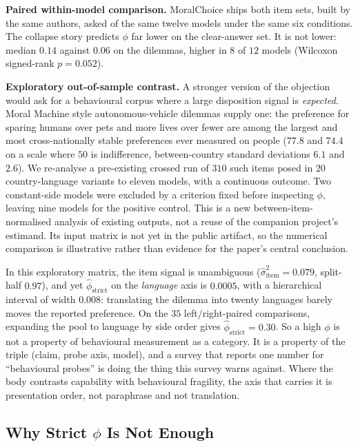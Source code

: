 \documentclass[11pt]{article}
\begin{document}
\textbf{Paired within-model comparison.} MoralChoice ships both item sets, built
by the same authors, asked of the same twelve models under the same six
conditions. The collapse story predicts $\phi$ far lower on the clear-answer set.
It is not lower: median $0.14$ against $0.06$ on the dilemmas, higher in $8$ of
$12$ models (Wilcoxon signed-rank $p=0.052$).

\textbf{Exploratory out-of-sample contrast.} A stronger version of the
objection would ask for a behavioural corpus where a large disposition signal is
\emph{expected}. Moral Machine style autonomous-vehicle dilemmas supply one: the
preference for sparing humans over pets and more lives over fewer are among the
largest and most cross-nationally stable preferences ever measured on people
($77.8$ and $74.4$ on a scale where $50$ is indifference, between-country
standard deviations $6.1$ and $2.6$). We re-analyse a pre-existing crossed run of
$310$ such items posed in $20$ country-language variants to eleven models, with a
continuous outcome. Two constant-side models were excluded by a criterion fixed
before inspecting $\phi$, leaving nine models for the positive control. This is a
new between-item-normalised analysis of existing outputs, not a reuse of the
companion project's estimand. Its input matrix is not yet in the public
artifact, so the numerical comparison is illustrative rather than evidence for
the paper's central conclusion.

In this exploratory matrix, the item signal is unambiguous
($\hat\sigma^2_{\text{item}}=0.079$, split-half $0.97$), and yet
$\hat\phi_{\text{strict}}$ on the \emph{language} axis is $0.0005$, with a
hierarchical interval of width $0.008$: translating the dilemma into twenty
languages barely moves the reported preference. On the $35$ left/right-paired
comparisons, expanding the pool to language by side order gives
$\hat\phi_{\text{strict}}=0.30$. So a high $\phi$ is not
a property of behavioural measurement as a category. It is a property of the
triple (claim, probe axis, model), and a survey that reports one number for
``behavioural probes'' is doing the thing this survey warns against. Where the
body contrasts capability with behavioural fragility, the axis that carries it is
presentation order, not paraphrase and not translation.

\subsection{Why Strict $\phi$ Is Not Enough}
\label{app:strictbroad}
\end{document}
